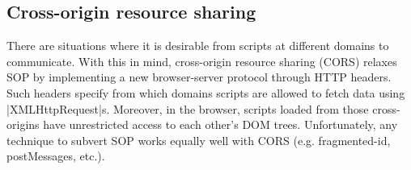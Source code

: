 \subsection{Cross-origin resource sharing } 


There are situations where it is desirable from scripts at different domains to
communicate. With this in mind, cross-origin resource sharing (CORS) relaxes SOP
by implementing a new browser-server protocol through HTTP headers.  Such
headers specify from which domains scripts are allowed to fetch data 
using \js|XMLHttpRequest|s. Moreover, in the browser, scripts loaded from
those cross-origins have unrestricted access to each other's DOM
trees. Unfortunately, any technique to subvert SOP works equally well with CORS 
(e.g. fragmented-id, postMessages, etc.).



